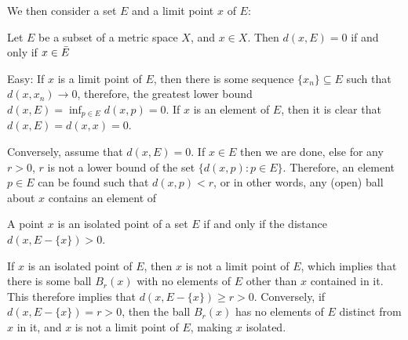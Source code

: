 We then consider a set $E$ and a limit point $x$ of $E$:
\begin{bprop}{}{}
Let $E$ be a subset of a metric space $X$, and $x\in X$. Then $d(x,E) = 0$ if and only if $x\in\Bar{E}$
\end{bprop}
\begin{bproof}{}{}
Easy: If $x$ is a limit point of $E$, then there is some sequence $\{ x_{n} \} \subseteq E$ such that \mbox{$d(x,x_{n})\to 0$}, therefore, the greatest lower bound \mbox{$d(x,E) = \inf_{p\in E} d(x, p) = 0$.} If $x$ is an element of $E$, then it is clear that \mbox{$d(x,E) = d(x,x) = 0$}.

Conversely, assume that $d(x,E) = 0$. If $x\in E$ then we are done, else for any $r>0$, $r$ is not a lower bound of the set \mbox{$\{ d(x,p) : p\in E\}$}. Therefore, an element $p\in E$ can be found such that $d(x,p)<r$, or in other words, any (open) ball about $x$ contains an element of 
\eop
\end{bproof}

\begin{bprop}{}{}
A point $x$ is an isolated point of a set $E$ if and only if the distance \mbox{$d(x, E - \{x\}) > 0$}.
\end{bprop}

\begin{bproof}{}{}
If $x$ is an isolated point of $E$, then $x$ is not a limit point of $E$, which implies that there is some ball $B_{r}(x)$ with no elements of $E$ other than $x$ contained in it. This therefore implies that $d(x, E - \{x\}) \geq r > 0$. Conversely, if \mbox{$d(x, E - \{x\}) = r >0$,} then the ball $B_{r}(x)$ has no elements of $E$ distinct from $x$ in it, and $x$ is not a limit point of $E$, making $x$ isolated.
\eop
\end{bproof}
